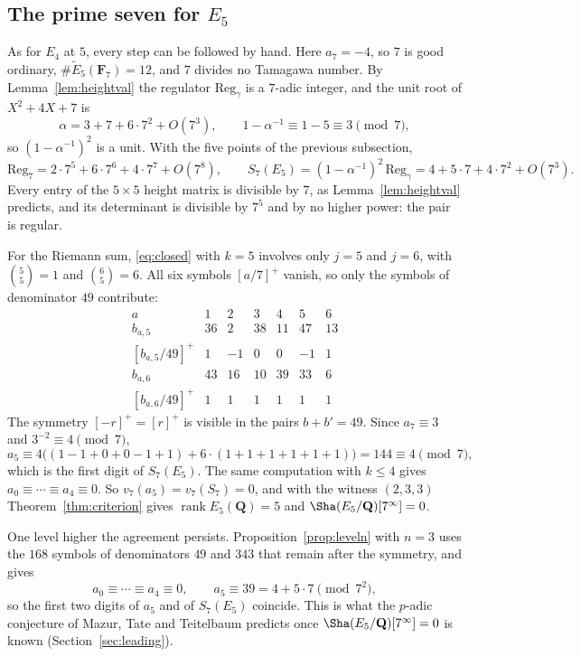\documentclass[11pt]{amsart}
\theoremstyle{definition}
\newcommand{\Q}{\mathbf{Q}}
\newcommand{\F}{\mathbf{F}}
\newcommand{\Reg}{\mathrm{Reg}}
\newcommand{\rk}{\operatorname{rank}}
\begin{document}
\subsection{The prime seven for \texorpdfstring{$E_5$}{E5}}\label{ssec:e5p7}
As for $E_4$ at $5$, every step can be followed by hand. Here $a_7=-4$, so $7$ is good ordinary, $\#\tilde E_5(\F_7)=12$, and $7$ divides no Tamagawa number. By Lemma~\ref{lem:heightval} the regulator $\Reg_\gamma$ is a $7$-adic integer, and the unit root of $X^2+4X+7$ is
\[
\alpha=3+7+6\cdot7^2+O(7^3),\qquad 1-\alpha^{-1}\equiv1-5\equiv3\pmod7,
\]
so $(1-\alpha^{-1})^2$ is a unit. With the five points of the previous subsection,
\[
\Reg_7=2\cdot7^5+6\cdot7^6+4\cdot7^7+O(7^8),\qquad S_7(E_5)=(1-\alpha^{-1})^2\,\Reg_\gamma=4+5\cdot7+4\cdot7^2+O(7^3).
\]
Every entry of the $5\times5$ height matrix is divisible by $7$, as Lemma~\ref{lem:heightval} predicts, and its determinant is divisible by $7^5$ and by no higher power: the pair is regular.

For the Riemann sum, \eqref{eq:closed} with $k=5$ involves only $j=5$ and $j=6$, with $\binom55=1$ and $\binom65=6$. All six symbols $[a/7]^+$ vanish, so only the symbols of denominator $49$ contribute:
\[
\begin{array}{c|cccccc}
a&1&2&3&4&5&6\\\hline
b_{a,5}&36&2&38&11&47&13\\
{}[b_{a,5}/49]^+&1&-1&0&0&-1&1\\\hline
b_{a,6}&43&16&10&39&33&6\\
{}[b_{a,6}/49]^+&1&1&1&1&1&1
\end{array}
\]
The symmetry $[-r]^+=[r]^+$ is visible in the pairs $b+b'=49$. Since $a_7\equiv3$ and $3^{-2}\equiv4\pmod 7$,
\[
a_5\equiv4\bigl((1-1+0+0-1+1)+6\cdot(1+1+1+1+1+1)\bigr)=144\equiv4\pmod7,
\]
which is the first digit of $S_7(E_5)$. The same computation with $k\le4$ gives $a_0\equiv\cdots\equiv a_4\equiv0$. So $v_7(a_5)=v_7(S_7)=0$, and with the witness $(2,3,3)$ Theorem~\ref{thm:criterion} gives $\rk E_5(\Q)=5$ and $\Sha(E_5/\Q)[7^\infty]=0$.

One level higher the agreement persists. Proposition~\ref{prop:leveln} with $n=3$ uses the $168$ symbols of denominators $49$ and $343$ that remain after the symmetry, and gives
\[
a_0\equiv\cdots\equiv a_4\equiv0,\qquad a_5\equiv39=4+5\cdot7\pmod{7^2},
\]
so the first two digits of $a_5$ and of $S_7(E_5)$ coincide. This is what the $p$-adic conjecture of Mazur, Tate and Teitelbaum predicts once $\Sha(E_5/\Q)[7^\infty]=0$ is known (Section~\ref{sec:leading}).
\end{document}
